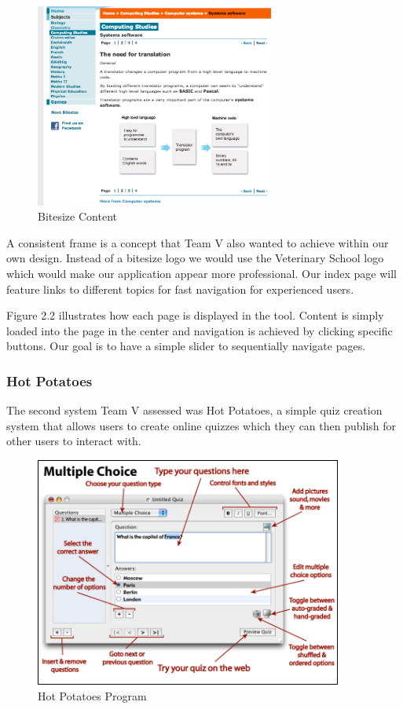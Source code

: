 \documentclass{l3proj}
\begin{document}
\begin{figure}[!ht]
\caption{Bitesize Content}
 \centering
\includegraphics[width=0.7\textwidth]{images/Bitesize/BitesizeContent.png}
\end{figure}

A consistent frame is a concept that Team V also wanted to achieve
within our own design. Instead of a bitesize logo we would use the
Veterinary School logo which would make our application appear more
professional. Our index page will feature links to different topics
for fast navigation for experienced users.

Figure 2.2 illustrates how each page is displayed in the tool. Content
is simply loaded into the page in the center and navigation is
achieved by clicking specific buttons. Our goal is to have a simple
slider to sequentially navigate pages.\
\newpage
\subsubsection{Hot Potatoes}

The second system Team V assessed was Hot Potatoes, a simple quiz
creation system that allows users to create online quizzes which they
can then publish for other users to interact with.\\ 

\begin{figure}[!htb]
\caption{Hot Potatoes Program}
 \centering
\includegraphics[width=0.9\textwidth]{images/HotPotatoes/HotPotatoesQuestion.jpg}
\end{figure}
\end{document}
